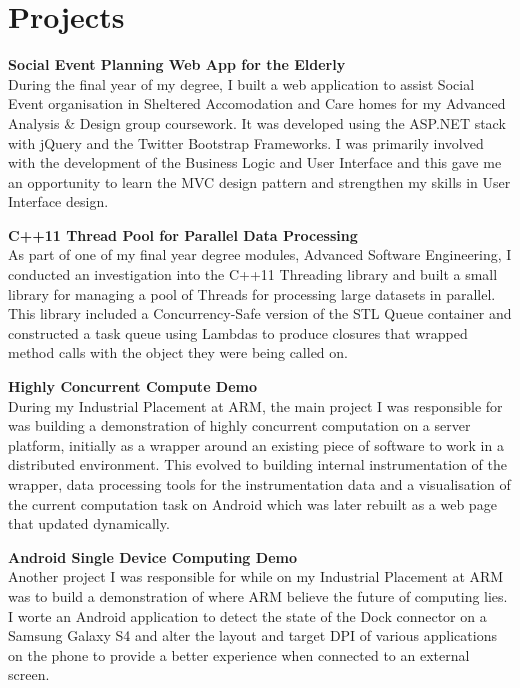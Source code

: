\documentclass[a4paper,10pt]{article} %
\begin{document}
\section{Projects}
\textbf{Social Event Planning Web App for the Elderly} \\
During the final year of my degree, I built a web application to assist Social Event organisation in Sheltered Accomodation and Care homes for my Advanced Analysis \& Design group coursework. It was developed using the ASP.NET stack with jQuery and the Twitter Bootstrap Frameworks. I was primarily involved with the development of the Business Logic and User Interface and this gave me an opportunity to learn the MVC design pattern and strengthen my skills in User Interface design. \\
\par

\textbf{C++11 Thread Pool for Parallel Data Processing} \\
As part of one of my final year degree modules, Advanced Software Engineering, I conducted an investigation into the C++11 Threading library and built a small library for managing a pool of Threads for processing large datasets in parallel. This library included a Concurrency-Safe version of the STL Queue container and constructed a task queue using Lambdas to produce closures that wrapped method calls with the object they were being called on. \\
\par

\textbf{Highly Concurrent Compute Demo} \\
During my Industrial Placement at ARM, the main project I was responsible for was building a demonstration of highly concurrent computation on a server platform, initially as a wrapper around an existing piece of software to work in a distributed environment. This evolved to building internal instrumentation of the wrapper, data processing tools for the instrumentation data and a visualisation of the current computation task on Android which was later rebuilt as a web page that updated dynamically. \\
\par

\textbf{Android Single Device Computing Demo} \\
Another project I was responsible for while on my Industrial Placement at ARM was to build a demonstration of where ARM believe the future of computing lies. I worte an Android application to detect the state of the Dock connector on a Samsung Galaxy S4 and alter the layout and target DPI of various applications on the phone to provide a better experience when connected to an external screen. \\
\par
\end{document}
